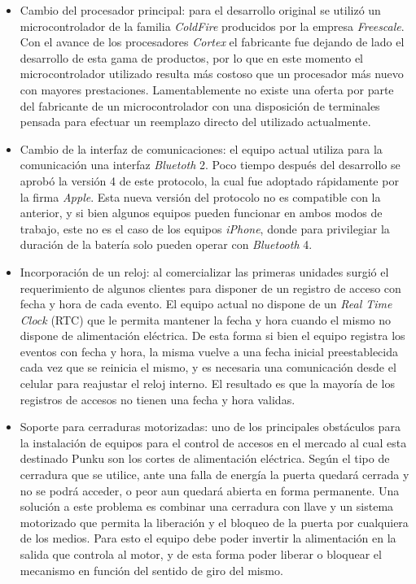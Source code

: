 \begin{itemize}
	\item Cambio del procesador principal: para el desarrollo original se utilizó un microcontrolador de la familia \emph{ColdFire} producidos por la empresa \emph{Freescale}. Con el avance de los procesadores \emph{Cortex} el fabricante fue dejando de lado el desarrollo de esta gama de productos, por lo que en este momento el microcontrolador utilizado resulta más costoso que un procesador más nuevo con mayores prestaciones. Lamentablemente no existe una oferta por parte del fabricante de un microcontrolador con una disposición de terminales pensada para efectuar un reemplazo directo del utilizado actualmente.
	
	\item Cambio de la interfaz de comunicaciones: el equipo actual utiliza para la comunicación una interfaz \emph{Bluetoth} 2. Poco tiempo después del desarrollo se aprobó la versión 4 de este protocolo, la cual fue adoptado rápidamente por la firma \emph{Apple}. Esta nueva versión del protocolo no es compatible con la anterior, y si bien algunos equipos pueden funcionar en ambos modos de trabajo, este no es el caso de los equipos \emph{iPhone}, donde para privilegiar la duración de la batería solo pueden operar con \emph{Bluetooth} 4.
	
	\item Incorporación de un reloj: al comercializar las primeras unidades surgió el requerimiento de algunos clientes para disponer de un registro de acceso con fecha y hora de cada evento. El equipo actual no dispone de un \emph{Real Time Clock} (RTC) que le permita mantener la fecha y hora cuando el mismo no dispone de alimentación eléctrica. De esta forma si bien el equipo registra los eventos con fecha y hora, la misma vuelve a una fecha inicial preestablecida cada vez que se reinicia el mismo, y es necesaria una comunicación desde el celular para reajustar el reloj interno. El resultado es que la mayoría de los registros de accesos no tienen una fecha y hora validas.
	
	\item Soporte para cerraduras motorizadas: uno de los principales obstáculos para la instalación de equipos para el control de accesos en el mercado al cual esta destinado Punku son los cortes de alimentación eléctrica. Según el tipo de cerradura que se utilice, ante una falla de energía la puerta quedará cerrada y no se podrá acceder, o peor aun quedará abierta en forma permanente. Una solución a este problema es combinar una cerradura con llave y un sistema motorizado que permita la liberación y el bloqueo de la puerta por cualquiera de los medios. Para esto el equipo debe poder invertir la alimentación en la salida que controla al motor, y de esta forma poder liberar o bloquear el mecanismo en función del sentido de giro del mismo.
	

\end{itemize}
